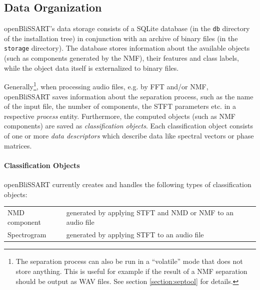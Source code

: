 %
%


\subsection{Data Organization}


openBliSSART's data storage consists of a SQLite database \cite{SQLite} (in the
{\tt db} directory of the installation tree) in conjunction with an archive of
binary files (in the {\tt storage} directory). The database stores information
about the available objects (such as components generated by the NMF), their
features and class labels, while the object data itself is externalized to
binary files.

Generally\footnote{The separation process can also be run in a ``volatile'' mode
  that does not store anything. This is useful for example if the result of a
  NMF separation should be output as WAV files. See section
  \ref{section:septool} for details.}, when processing audio files, e.g. by FFT
and/or NMF, openBliSSART saves information about the separation process, such as
the name of the input file, the number of components, the STFT parameters
etc. in a respective \emph{process} entity. Furthermore, the computed objects
(such as NMF components) are saved as \emph{classification objects}. Each
classification object consists of one or more \emph{data descriptors} which
describe data like spectral vectors or phase matrices.

\paragraph{Classification Objects} openBliSSART currently creates and handles
the following types of classification objects:
\begin{center}
  \begin{tabular}{|p{}|p{}|}
    \hline
    NMD component & generated by applying STFT and NMD or NMF
    to an audio file \\
    Spectrogram & generated by applying STFT to an audio file \\
    \hline
  \end{tabular}
\end{center}

